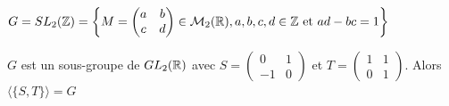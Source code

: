 \begin{exemple}

    $G = SL_2(\mathbb{Z}) = \left\{ M = \begin{pmatrix}
    a & b \\
    c & d
    \end{pmatrix} \in \mathcal M_2(\mathbb{R}), a, b, c, d \in \mathbb{Z} \text{ et } ad - bc = 1 \right\}$ 

    $G$ est un sous-groupe de $GL_2(\mathbb{R})$ avec $S = \begin{pmatrix}
    0 & 1 \\
    -1 & 0
    \end{pmatrix}$ et $T = \begin{pmatrix}
    1 & 1 \\
    0 & 1
    \end{pmatrix}$.
    Alors $\langle \{S, T\} \rangle = G$
\end{exemple}






